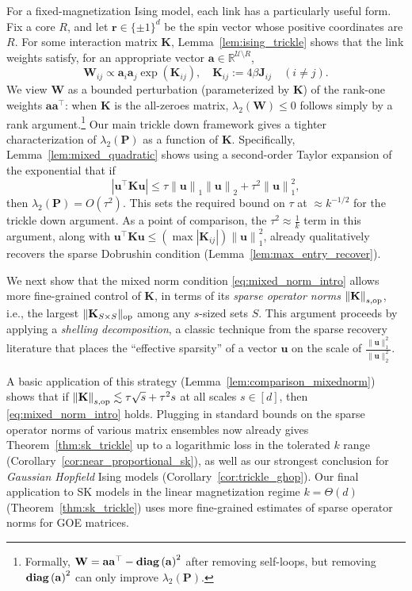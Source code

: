 \documentclass[11pt]{article}
\newcommand{\norm}[1]{\left\lVert#1\right\rVert}
\newcommand{\normsop}[1]{\lVert#1\rVert_{\textup{op}}}
\newcommand{\bK}{\mathbf K}
\newcommand{\br}{\mathbf r}
\newcommand{\lam}{\lambda}
\newcommand{\R}{\mathbb{R}}
\newcommand{\diag}[1]{\textbf{\textup{diag}}\left(#1\right)}
\newcommand{\1}{\mathbf{1}}
\newcommand{\0}{\mathbf{0}}
\newcommand{\Abs}[1]{\left|#1\right|}
\newcommand{\mj}{{\mathbf{J}}}
\newcommand{\mk}{{\mathbf{K}}}
\newcommand{\mpp}{{\mathbf{P}}}
\newcommand{\mw}{{\mathbf{W}}}
\newcommand{\normkop}[2]{{\left\lVert#1\right\rVert_{#2, \textup{op}}}}
\newcommand{\va}{{\mathbf{a}}}
\newcommand{\vu}{{\mathbf{u}}}
\newcommand{\calU}{{\mathcal{U}}}
\begin{document}
For a fixed-magnetization Ising model, each link has a particularly useful
form. Fix a core $R$, and let $\br\in\{\pm1\}^d$ be the spin vector whose
positive coordinates are $R$. For some interaction matrix $\bK$, Lemma~\ref{lem:ising_trickle} shows that the link
weights satisfy, for an appropriate vector $\va \in \R^{\calU \setminus R}$,
\begin{equation*}
    \mw_{ij}
    \propto
    \va_i \va_j\exp(\bK_{ij}),
    \quad
    \mk_{ij}:=4\beta\mj_{ij}
    \quad (i\neq j).
\end{equation*}
We view $\mw$ as a bounded perturbation (parameterized by $\mk$) of the rank-one weights $\va\va^\top$: when $\mk$ is the all-zeroes matrix, $\lam_2(\mw) \le 0$ follows simply by a rank argument.\footnote{Formally, $\mw = \va\va^\top - \diag{\va}^2$ after removing self-loops, but removing $\diag{\va}^2$ can only improve $\lam_2(\mpp)$.} Our main trickle down framework gives a tighter characterization of $\lam_2(\mpp)$ as a function of $\mk$. Specifically, Lemma~\ref{lem:mixed_quadratic} shows using a second-order Taylor expansion of the exponential that if
\begin{equation}\label{eq:mixed_norm_intro}\Abs{\vu^\top \mk \vu} \le \tau\norm{\vu}_1 \norm{\vu}_2 + \tau^2\norm{\vu}_1^2,\end{equation}
then $\lam_2(\mpp) = O(\tau^2)$. 
This sets the required bound on $\tau$ at $\approx k^{-1/2}$ for the trickle down argument. As a point of comparison, the $\tau^2 \approx \frac 1 k$ term in this argument, along with $\vu^\top \mk \vu \le (\max |\mk_{ij}|)\norm{\vu}_1^2$, already qualitatively recovers the sparse Dobrushin condition (Lemma~\ref{lem:max_entry_recover}).

We next show that the mixed norm condition \eqref{eq:mixed_norm_intro} allows more fine-grained control of $\mk$, in terms of its \emph{sparse operator norms} $\normkop{\mk}{s}$, i.e., the largest $\normsop{\mk_{S \times S}}$ among any $s$-sized sets $S$. This argument proceeds by applying a \emph{shelling decomposition}, a classic technique from the sparse recovery literature \cite{CandesRT06} that places the ``effective sparsity'' of a vector $\vu$ on the scale of $\frac{\|\vu\|_1^2}{\|\vu\|_2^2}$. 

A basic application of this strategy (Lemma~\ref{lem:comparison_mixednorm}) shows that if $\normkop{\mk}{s} \lesssim \tau\sqrt{s} + \tau^2 s$ at all scales $s \in [d]$, then  \eqref{eq:mixed_norm_intro} holds. Plugging in standard bounds on the sparse operator norms of various matrix ensembles now already gives Theorem~\ref{thm:sk_trickle} up to a logarithmic loss in the tolerated $k$ range (Corollary~\ref{cor:near_proportional_sk}), as well as our strongest conclusion for \emph{Gaussian Hopfield} Ising models (Corollary~\ref{cor:trickle_ghop}). Our final application to SK models in the linear magnetization regime $k = \Theta(d)$ (Theorem~\ref{thm:sk_trickle}) uses more fine-grained estimates of sparse operator norms for GOE matrices.
\end{document}
